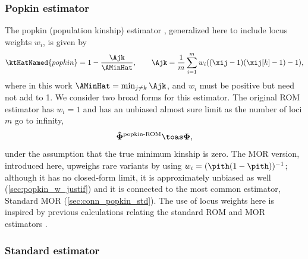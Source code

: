 \documentclass[11pt]{article}
\newcommand{\kinMat}{%
  \ensuremath{%
    \mathbf{\Phi}
  }%
  \xspace%
}%
\newcommand{\kinMatEstNamed}[1]{%
  \ensuremath{%
    \mathbf{\hat{\Phi}}^\text{#1}
  }%
  \xspace%
}%
\begin{document}
\subsubsection{Popkin estimator}

The popkin (population kinship) estimator \citep{ochoa_estimating_2021}, generalized here to include locus weights $w_i$, is given by
\begin{equation}
  \label{eq:popkin}
  \ktHatNamed{popkin}
  =
  1 - \frac{\Ajk}{\AMinHat}
  , \quad\quad
  \Ajk
  =
  \frac{1}{m} \sum_{i=1}^m w_i ( (\xij-1)(\xij[k]-1) - 1 )
  ,
\end{equation}
where in this work $\AMinHat = \min_{j \ne k} \Ajk$, and $w_i$ must be positive but need not add to 1.
We consider two broad forms for this estimator.
The original ROM estimator has $w_i = 1$ and has an unbiased almost sure limit as the number of loci $m$ go to infinity,
$$
\kinMatEstNamed{popkin-ROM} \toas \kinMat,
$$
under the assumption that the true minimum kinship is zero.
The MOR version, introduced here, upweighs rare variants by using $w_i = (\pith (1-\pith))^{-1}$; although it has no closed-form limit, it is approximately unbiased as well (\cref{sec:popkin_w_justif}) and it is connected to the most common estimator, Standard MOR (\cref{sec:conn_popkin_std}). 
The use of locus weights here is inspired by previous calculations relating the standard ROM and MOR estimators \citep{wang_efficient_2017}.

\subsubsection{Standard estimator}
\end{document}
